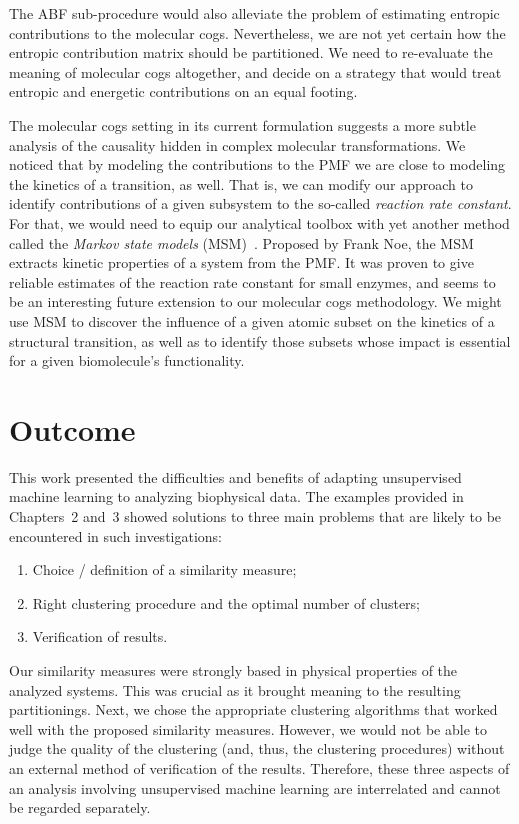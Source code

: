 \documentclass[a4paper,11pt,twoside]{book}%
\begin{document}
The ABF sub-procedure would also alleviate the problem of estimating entropic contributions to the molecular cogs.
Nevertheless, we are not yet certain how the entropic contribution matrix should be partitioned.
We need to re-evaluate the meaning of molecular cogs altogether, and decide on a strategy that would treat entropic and energetic contributions on an equal footing.

The molecular cogs setting in its current formulation suggests a more subtle analysis of the causality hidden in complex molecular transformations.
We noticed that by modeling the contributions to the PMF we are close to modeling the kinetics of a transition, as well.
That is, we can modify our approach to identify contributions of a given subsystem to the so-called \emph{reaction rate constant}.
For that, we would need to equip our analytical toolbox with yet another method called the \emph{Markov state models} (MSM)~\cite{sarich2010approximation}.
Proposed by Frank Noe, the MSM extracts kinetic properties of a system from the PMF.
It was proven to give reliable estimates of the reaction rate constant for small enzymes, and seems to be an interesting future extension to our molecular cogs methodology.
We might use MSM to discover the influence of a given atomic subset on the kinetics of a structural transition, as well as to identify those subsets whose impact is essential for a given biomolecule's functionality.

\section{Outcome}

This work presented the difficulties and benefits of adapting unsupervised machine learning to analyzing biophysical data.
The examples provided in Chapters~2 and~3 showed solutions to three main problems that are likely to be encountered in such investigations:
\begin{enumerate}
 \item Choice / definition of a similarity measure;
 \item Right clustering procedure and the optimal number of clusters;
 \item Verification of results.
\end{enumerate}

Our similarity measures were strongly based in physical properties of the analyzed systems.
This was crucial as it brought meaning to the resulting partitionings.
Next, we chose the appropriate clustering algorithms that worked well with the proposed similarity measures.
However, we would not be able to judge the quality of the clustering (and, thus, the clustering procedures) without an external method of verification of the results.
Therefore, these three aspects of an analysis involving unsupervised machine learning are interrelated and cannot be regarded separately.
\end{document}
